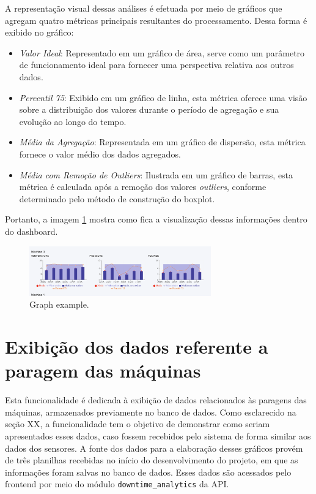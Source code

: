 A representação visual dessas análises é efetuada por meio de gráficos que agregam quatro métricas principais resultantes do processamento. Dessa forma é exibido no gráfico:

\begin{itemize}
    \item \textit{Valor Ideal}: Representado em um gráfico de área, serve como um parâmetro de funcionamento ideal para fornecer uma perspectiva relativa aos outros dados.
    \item \textit{Percentil 75}: Exibido em um gráfico de linha, esta métrica oferece uma visão sobre a distribuição dos valores durante o período de agregação e sua evolução ao longo do tempo.
    \item \textit{Média da Agregação}: Representada em um gráfico de dispersão, esta métrica fornece o valor médio dos dados agregados.
    \item \textit{Média com Remoção de \textit{Outliers}}: Ilustrada em um gráfico de barras, esta métrica é calculada após a remoção dos valores \textit{outliers}, conforme determinado pelo método de construção do boxplot.
\end{itemize}

Portanto, a imagem \ref{fig:graphData} mostra como fica a visualização dessas informações dentro do dashboard.

\begin{figure}[htbp]
	\centering
	\includegraphics[width=0.7\textwidth]{images/graphData.png}
	\caption{Graph example.}
	\label{fig:graphData}
\end{figure}

\section[Exibição dos dados referente a paragem das máquinas]{Exibição dos dados referente a paragem das máquinas}\label{sec:downtime}

Esta funcionalidade é dedicada à exibição de dados relacionados às paragens das máquinas, armazenados previamente no banco de dados. Como esclarecido na seção XX, a funcionalidade tem o objetivo de demonstrar como seriam apresentados esses dados, caso fossem recebidos pelo sistema de forma similar aos dados dos sensores. A fonte dos dados para a elaboração desses gráficos provém de três planilhas recebidas no início do desenvolvimento do projeto, em que as informações foram salvas no banco de dados. Esses dados são acessados pelo frontend por meio do módulo \texttt{downtime\_analytics} da API.

